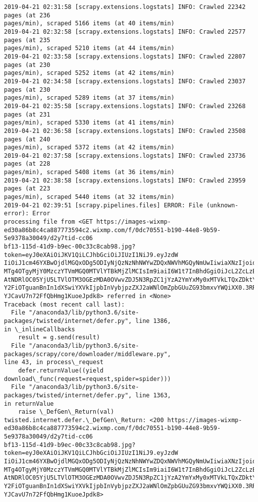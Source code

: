 \documentclass[11pt]{article}
\begin{document}
\begin{Verbatim}[commandchars=\\\{\},fontsize=\footnotesize]
2019-04-21 02:31:58 [scrapy.extensions.logstats] INFO: Crawled 22342 pages (at 236
pages/min), scraped 5166 items (at 40 items/min)
2019-04-21 02:32:58 [scrapy.extensions.logstats] INFO: Crawled 22577 pages (at 235
pages/min), scraped 5210 items (at 44 items/min)
2019-04-21 02:33:58 [scrapy.extensions.logstats] INFO: Crawled 22807 pages (at 230
pages/min), scraped 5252 items (at 42 items/min)
2019-04-21 02:34:58 [scrapy.extensions.logstats] INFO: Crawled 23037 pages (at 230
pages/min), scraped 5289 items (at 37 items/min)
2019-04-21 02:35:58 [scrapy.extensions.logstats] INFO: Crawled 23268 pages (at 231
pages/min), scraped 5330 items (at 41 items/min)
2019-04-21 02:36:58 [scrapy.extensions.logstats] INFO: Crawled 23508 pages (at 240
pages/min), scraped 5372 items (at 42 items/min)
2019-04-21 02:37:58 [scrapy.extensions.logstats] INFO: Crawled 23736 pages (at 228
pages/min), scraped 5408 items (at 36 items/min)
2019-04-21 02:38:58 [scrapy.extensions.logstats] INFO: Crawled 23959 pages (at 223
pages/min), scraped 5440 items (at 32 items/min)
2019-04-21 02:39:51 [scrapy.pipelines.files] ERROR: File (unknown-error): Error
processing file from <GET https://images-wixmp-
ed30a86b8c4ca887773594c2.wixmp.com/f/0dc70551-b190-44e8-9b59-5e9378a30049/d2y7tid-cc06
bf13-115d-41d9-b9ec-00c33c8cab98.jpg?token=eyJ0eXAiOiJKV1QiLCJhbGciOiJIUzI1NiJ9.eyJzdW
IiOiJ1cm46YXBwOjdlMGQxODg5ODIyNjQzNzNhNWYwZDQxNWVhMGQyNmUwIiwiaXNzIjoidXJuOmFwcDo3ZTBk
MTg4OTgyMjY0MzczYTVmMGQ0MTVlYTBkMjZlMCIsIm9iaiI6W1t7InBhdGgiOiJcL2ZcLzBkYzcwNTUxLWIxOT
AtNDRlOC05YjU5LTVlOTM3OGEzMDA0OVwvZDJ5N3RpZC1jYzA2YmYxMy0xMTVkLTQxZDktYjllYy0wMGMzM2M4
Y2FiOTguanBnIn1dXSwiYXVkIjpbInVybjpzZXJ2aWNlOmZpbGUuZG93bmxvYWQiXX0.3RRjMd6\_q6cBQZh-
YJCavU7n72FfQbHmg1KuoeJpdk8> referred in <None>
Traceback (most recent call last):
  File "/anaconda3/lib/python3.6/site-packages/twisted/internet/defer.py", line 1386,
in \_inlineCallbacks
    result = g.send(result)
  File "/anaconda3/lib/python3.6/site-packages/scrapy/core/downloader/middleware.py",
line 43, in process\_request
    defer.returnValue((yield download\_func(request=request,spider=spider)))
  File "/anaconda3/lib/python3.6/site-packages/twisted/internet/defer.py", line 1363,
in returnValue
    raise \_DefGen\_Return(val)
twisted.internet.defer.\_DefGen\_Return: <200 https://images-wixmp-
ed30a86b8c4ca887773594c2.wixmp.com/f/0dc70551-b190-44e8-9b59-5e9378a30049/d2y7tid-cc06
bf13-115d-41d9-b9ec-00c33c8cab98.jpg?token=eyJ0eXAiOiJKV1QiLCJhbGciOiJIUzI1NiJ9.eyJzdW
IiOiJ1cm46YXBwOjdlMGQxODg5ODIyNjQzNzNhNWYwZDQxNWVhMGQyNmUwIiwiaXNzIjoidXJuOmFwcDo3ZTBk
MTg4OTgyMjY0MzczYTVmMGQ0MTVlYTBkMjZlMCIsIm9iaiI6W1t7InBhdGgiOiJcL2ZcLzBkYzcwNTUxLWIxOT
AtNDRlOC05YjU5LTVlOTM3OGEzMDA0OVwvZDJ5N3RpZC1jYzA2YmYxMy0xMTVkLTQxZDktYjllYy0wMGMzM2M4
Y2FiOTguanBnIn1dXSwiYXVkIjpbInVybjpzZXJ2aWNlOmZpbGUuZG93bmxvYWQiXX0.3RRjMd6\_q6cBQZh-
YJCavU7n72FfQbHmg1KuoeJpdk8>


\end{Verbatim}
\end{document}
